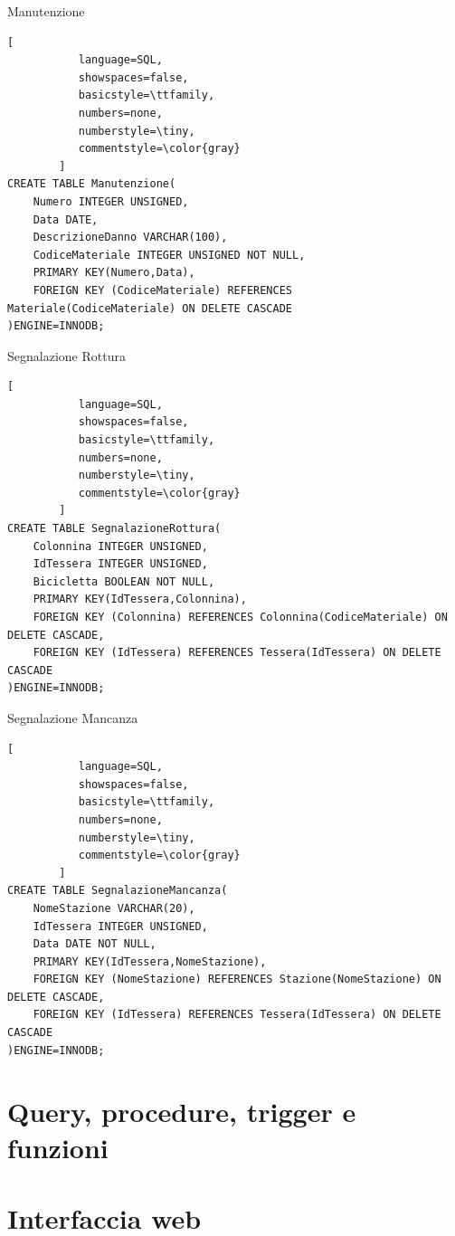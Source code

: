 \documentclass[a4paper,twoside]{article}
\begin{document}
Manutenzione
\begin{lstlisting}[
           language=SQL,
           showspaces=false,
           basicstyle=\ttfamily,
           numbers=none,
           numberstyle=\tiny,
           commentstyle=\color{gray}
        ]
CREATE TABLE Manutenzione(
	Numero INTEGER UNSIGNED,
	Data DATE,
	DescrizioneDanno VARCHAR(100),
	CodiceMateriale INTEGER UNSIGNED NOT NULL,
	PRIMARY KEY(Numero,Data),
	FOREIGN KEY (CodiceMateriale) REFERENCES Materiale(CodiceMateriale) ON DELETE CASCADE
)ENGINE=INNODB;
\end{lstlisting}
Segnalazione Rottura
\begin{lstlisting}[
           language=SQL,
           showspaces=false,
           basicstyle=\ttfamily,
           numbers=none,
           numberstyle=\tiny,
           commentstyle=\color{gray}
        ]
CREATE TABLE SegnalazioneRottura(
	Colonnina INTEGER UNSIGNED,
	IdTessera INTEGER UNSIGNED,
	Bicicletta BOOLEAN NOT NULL,
	PRIMARY KEY(IdTessera,Colonnina),
	FOREIGN KEY (Colonnina) REFERENCES Colonnina(CodiceMateriale) ON DELETE CASCADE,
	FOREIGN KEY (IdTessera) REFERENCES Tessera(IdTessera) ON DELETE CASCADE
)ENGINE=INNODB;
\end{lstlisting}
Segnalazione Mancanza
\begin{lstlisting}[
           language=SQL,
           showspaces=false,
           basicstyle=\ttfamily,
           numbers=none,
           numberstyle=\tiny,
           commentstyle=\color{gray}
        ]
CREATE TABLE SegnalazioneMancanza(
	NomeStazione VARCHAR(20),
	IdTessera INTEGER UNSIGNED,
	Data DATE NOT NULL,
	PRIMARY KEY(IdTessera,NomeStazione),
	FOREIGN KEY (NomeStazione) REFERENCES Stazione(NomeStazione) ON DELETE CASCADE,
	FOREIGN KEY (IdTessera) REFERENCES Tessera(IdTessera) ON DELETE CASCADE
)ENGINE=INNODB;
\end{lstlisting}




\section{Query, procedure, trigger e funzioni}

\section{Interfaccia web}
\end{document}
